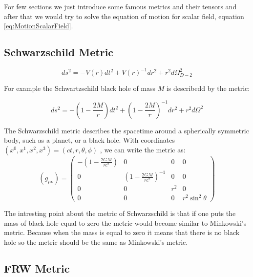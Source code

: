For few sections we just introduce some famous metrics and their tensors and after that we would try to solve the equation of motion for scalar field, equation \ref{eq:MotionScalarField}.

\subsection{Schwarzschild Metric}

\begin{equation} \label{eq:SchwarzschildMetric}
    ds^2 = -V(r) dt^2 + V(r)^{-1} dr^2 + r^2 d\Omega^2_{D-2}
\end{equation}

For example the Schwartzschild black hole of mass $M$ is describedd by the metric:

\begin{equation} \label{eq:SchwarzschildMetric}
    ds^2 = -(1 - \frac{2 M}{r}) dt^2 + (1 - \frac{2 M}{r})^{-1} dr^2 + r^2 d\Omega^2
\end{equation}

The Schwarzschild metric describes the spacetime around a spherically symmetric body, such as a planet, or a black hole. With coordinates $(x^0, x^1, x^2, x^3)=(ct, r, \theta, \phi)$ , we can write the metric as:\\

\begin{equation} \label{eq:SchwarzschildSphericalMetricTensor}
    (g_{\mu\nu}) = 
    \begin{pmatrix}
        -(1-\frac{2GM}{rc^2}) & 0 & 0 & 0\\
        0 & (1-\frac{2GM}{r c^2})^{-1} & 0 & 0 \\
        0 & 0 & r^2 & 0 \\
        0 & 0 & 0 & r^2 \sin^2 \theta 
    \end{pmatrix} 
\end{equation}

The intresting point about the metric of Schwarzschild is that if one puts the mass of black hole equal to zero the metric would become similar to Minkowski's metric. Because when the mass is equal to zero it means that there is no black hole so the metric should be the same as Minkowski's metric.\\

\subsection{FRW Metric}

